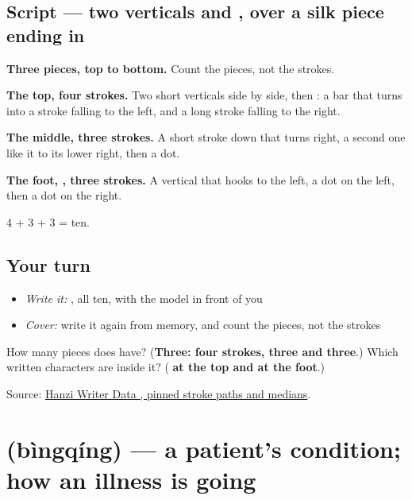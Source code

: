\subsection*{Script — two verticals and , over a silk piece ending in }

\begin{quote}
\end{quote}

\textbf{Three pieces, top to bottom.} Count the pieces, not the strokes.

\textbf{The top, four strokes.} Two short verticals side by side, then : a bar that turns into a stroke falling to the left, and a long stroke falling to the right.

\textbf{The middle, three strokes.} A short stroke down that turns right, a second one like it to its lower right, then a dot.

\textbf{The foot, , three strokes.} A vertical that hooks to the left, a dot on the left, then a dot on the right.

4 + 3 + 3 = ten.

\subsection*{Your turn}
\begin{itemize}
\raggedright
  \item \emph{Write it:} , all ten, with the model in front of you
  \item \emph{Cover:} write it again from memory, and count the pieces, not the strokes
\end{itemize}

\begin{tcolorbox}[breakable,colback=teal!4,colframe=teal!35!black,title={Before you move on}]
How many pieces does  have? (\textbf{Three: four strokes, three and three}.) Which written characters are inside it? (\textbf{ at the top and  at the foot}.)

Source: \href{https://raw.githubusercontent.com/chanind/hanzi-writer-data/68d10a4b21150cae5e1ebbd223eed289cf32d90c/data/\%E7\%B4\%A7.json}{Hanzi Writer Data , pinned stroke paths and medians}.
\end{tcolorbox}
\section[\texorpdfstring{\zh{病情} (bìngqíng)}{病情 (bìngqíng)}]{ (bìngqíng) — a patient's condition; how an illness is going}

